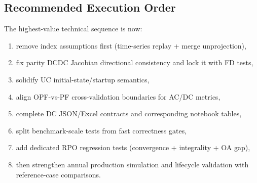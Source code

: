 \subsection{Recommended Execution Order}

The highest-value technical sequence is now:
\begin{enumerate}
  \item remove index assumptions first (time-series replay + merge unprojection),
  \item fix parity DCDC Jacobian directional consistency and lock it with FD tests,
  \item solidify UC initial-state/startup semantics,
  \item align OPF-vs-PF cross-validation boundaries for AC/DC metrics,
  \item complete DC JSON/Excel contracts and corresponding notebook tables,
  \item split benchmark-scale tests from fast correctness gates,
  \item add dedicated RPO regression tests (convergence + integrality + OA gap),
  \item then strengthen annual production simulation and lifecycle validation with reference-case comparisons.
\end{enumerate}
